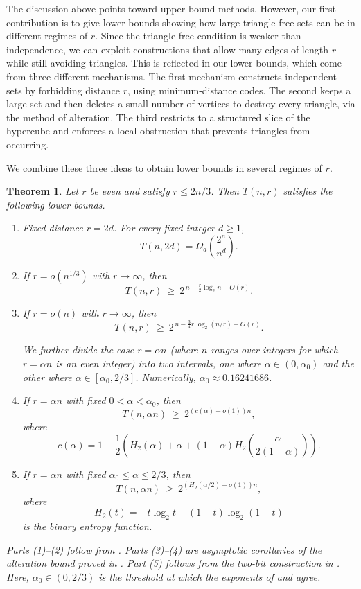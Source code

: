 \documentclass[11pt]{article}
\theoremstyle{plain}
\newtheorem{theorem}{Theorem}
\begin{document}
The discussion above points toward upper-bound methods.
However, our first contribution is to give lower bounds showing how large triangle-free sets can be in different
regimes of $r$.
Since the triangle-free condition is weaker than independence, we can exploit constructions that allow many edges of length $r$ while still avoiding triangles.
This is reflected in our lower bounds, which come from three different mechanisms.
The first mechanism constructs independent sets by forbidding distance $r$, using minimum-distance codes.
The second keeps a large set and then deletes a small number of vertices to destroy every triangle, via the method of alteration.
The third restricts to a structured slice of the hypercube and enforces a local obstruction that prevents triangles from occurring.

We combine these three ideas to obtain lower bounds in several regimes of $r$.

\begin{theorem}\label{thm:lower-main}
Let $r$ be even and satisfy $r\le 2n/3$.
Then $T(n,r)$ satisfies the following lower bounds.

\begin{enumerate}
\item Fixed distance $r=2d$.
For every fixed integer $d\ge 1$,
\[
T(n,2d)=\Omega_d\!\left(\frac{2^n}{n^d}\right).
\]

\item If $r=o(n^{1/3})$ with $r\to\infty$, then
\[
T(n,r)\ \ge\ 2^{\,n-\frac r2\log_2 n-O(r)}.
\]

\item If $r=o(n)$ with $r\to\infty$, then
\[
T(n,r)\ \ge\ 2^{\,n-\frac{3}{4}r\log_2(n/r)-O(r)}.
\]

We further divide the case $r=\alpha n$ (where $n$ ranges over integers for which $r=\alpha n$ is an even integer) into two intervals, one where $\alpha\in(0,\alpha_0)$ and the other where $\alpha\in[\alpha_0,2/3]$.
Numerically, $\alpha_0\approx 0.16241686$.

\item If $r=\alpha n$ with fixed $0<\alpha<\alpha_0$, then
\[
T(n,\alpha n)\ \ge\ 2^{(c(\alpha)-o(1))n},
\]
where
\[
c(\alpha)=
1-\frac12\left(
H_2(\alpha)+\alpha+(1-\alpha)H_2\!\left(\frac{\alpha}{2(1-\alpha)}\right)
\right).
\]

\item If $r=\alpha n$ with fixed $\alpha_0\le \alpha\le 2/3$, then
\[
T(n,\alpha n)\ \ge\ 2^{(H_2(\alpha/2)-o(1))n},
\]
where
\[
H_2(t)=-t\log_2 t-(1-t)\log_2(1-t)
\]
is the binary entropy function.
\end{enumerate}

Parts (1)--(2) follow from .
Parts (3)--(4) are asymptotic corollaries of the alteration bound proved in .
Part (5) follows from the two-bit construction in .
Here, $\alpha_0\in(0,2/3)$ is the threshold at which the exponents of  and  agree.
\end{theorem}
\end{document}
